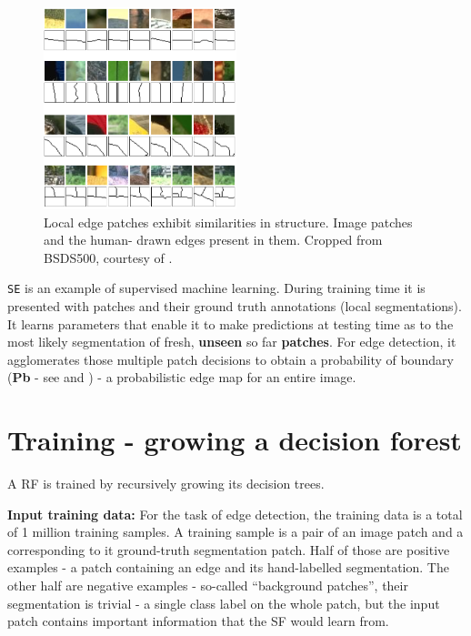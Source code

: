 \begin{figure}[ht!]
\centering
 \includegraphics[width=0.5\textwidth]{images/srf/structure-in-edge-patches.png}
\caption[Local patches exhibit similarities in edge structure]{Local edge patches exhibit similarities in structure. Image patches and the human-%
drawn edges present in them. Cropped from BSDS500, courtesy of \cite{DollarICCV13PresentationSlides}.}
\label{fig:srf-structure-in-edge-patches}
\end{figure}

{\tt SE} is an example of supervised machine learning. During training time it is presented with patches and their ground truth annotations (local segmentations). It learns parameters that enable it to make predictions at testing time as to the most likely segmentation of fresh, {\bf unseen} so far {\bf patches}. For edge detection, it agglomerates those multiple patch decisions to obtain a probability of boundary ({\bf Pb} - see  and ) - a probabilistic edge map for an entire image.

\section{Training - growing a decision forest}
A RF is trained by recursively growing its decision trees. 

\textbf{Input training data:} For the task of edge detection, the training data is a total of 1 million training samples. A training sample is a pair of an image patch and a corresponding to it ground-truth segmentation patch. Half of those are positive examples - a patch containing an edge and its hand-labelled segmentation. The other half are negative examples - so-called ``background patches'', their segmentation is trivial - a single class label on the whole patch, but the input patch contains important information that the SF would learn from. 

